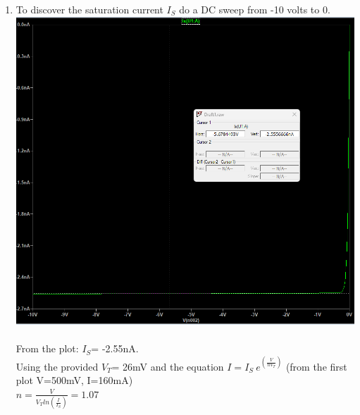 \documentclass{article}
\begin{document}
\begin{enumerate}
				\pagebreak
				\item To discover the saturation current \(I_S\) do a DC sweep from -10 volts to 0.\\
				\includegraphics[scale=0.35]{prelab/problem 1 - 3}\\\\
				From the plot: \(I_S\)= -2.55nA.\\
				Using the provided \(V_T\)= 26mV and the equation \(I=I_S\ e^{(\frac{V}{nV_T})}\) (from the first plot V=500mV, I=160mA)\\
				\(n = \frac{V}{V_T ln(\frac{I}{I_S})} = 1.07\)\\\\\\\\
			\end{enumerate}
			\pagebreak
\end{document}
